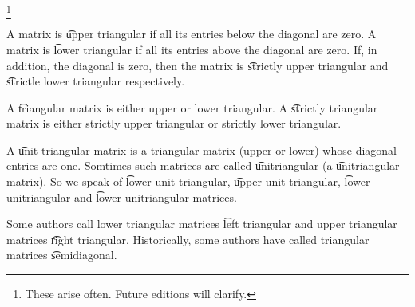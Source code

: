 
\footnote{These arise often. Future editions will clarify.}


A matrix is \t{upper triangular} if all its entries below the diagonal are zero.
A matrix is \t{lower triangular} if all its entries above the diagonal are zero.
If, in addition, the diagonal is zero, then the matrix is \t{strictly upper triangular} and \t{strictle lower triangular} respectively.

A \t{triangular} matrix is either upper or lower triangular.
A \t{strictly triangular} matrix is either strictly upper triangular or strictly lower triangular.

A \t{unit triangular matrix} is a triangular matrix (upper or lower) whose diagonal entries are one.
Somtimes such matrices are called \t{unitriangular} (a \t{unitriangular matrix}).
So we speak of \t{lower unit triangular}, \t{upper unit triangular}, \t{lower unitriangular} and \t{lower unitriangular} matrices.


Some authors call lower triangular matrices \t{left triangular} and upper triangular matrices \t{right triangular}.
Historically, some authors have called triangular matrices \t{semidiagonal}.

\blankpage
